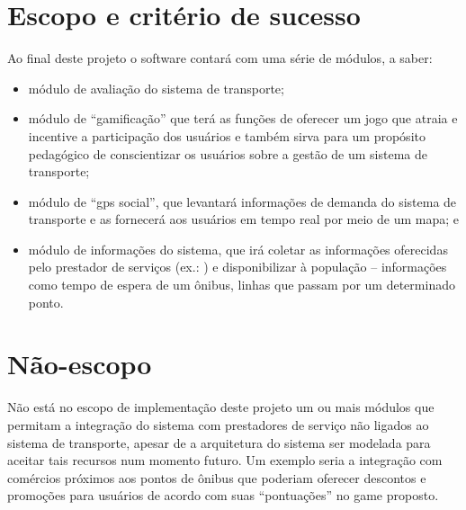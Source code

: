 \section{Escopo e critério de sucesso}\label{sec:Escopo}
	Ao final deste projeto o software contará com uma série de módulos, a saber:
	\begin{itemize}%
		\item módulo de avaliação do sistema de transporte;
		\item módulo de “gamificação” que terá as funções de oferecer um jogo que atraia e incentive a participação dos usuários e também sirva para um propósito pedagógico de conscientizar os usuários sobre a gestão de um sistema de transporte;
		\item módulo de ``gps social'', que levantará informações de demanda do sistema de transporte e as fornecerá aos usuários em tempo real por meio de um mapa; e
		\item módulo de informações do sistema, que irá coletar as informações oferecidas pelo prestador de serviços (ex.: \sptrans) e disponibilizar à população – informações como tempo de espera de um ônibus, linhas que passam por um determinado ponto.
	\end{itemize}

\section{Não-escopo}\label{sec:NãoEscopo}
	Não está no escopo de implementação deste projeto um ou mais módulos que permitam a integração do sistema com prestadores de serviço não ligados ao sistema de transporte, apesar de a arquitetura do sistema ser modelada para aceitar tais recursos num momento futuro. Um exemplo seria a integração com comércios próximos aos pontos de ônibus que poderiam oferecer descontos e promoções para usuários de acordo com suas ``pontuações'' no game proposto.


